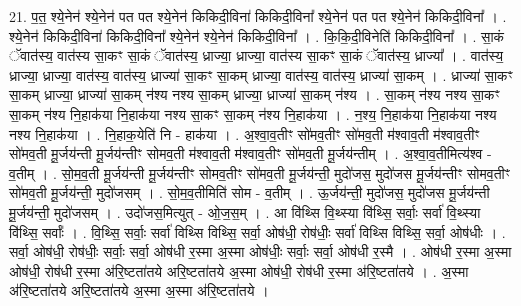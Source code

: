 \documentclass[17pt]{extarticle}
\begin{document}
21. प॒त॒ श्ये॒नेन॑ श्ये॒नेन॑ पत पत श्ये॒नेन॑ किकिदी॒विना॑ किकिदी॒विना᳚ श्ये॒नेन॑ पत पत श्ये॒नेन॑ किकिदी॒विना᳚ । . श्ये॒नेन॑ किकिदी॒विना॑ किकिदी॒विना᳚ श्ये॒नेन॑ श्ये॒नेन॑ किकिदी॒विना᳚ । . कि॒कि॒दी॒विनेति॑ किकिदी॒विना᳚ । . सा॒कं ॅवात॑स्य॒ वात॑स्य सा॒कꣳ सा॒कं ॅवात॑स्य॒ ध्राज्या॒ ध्राज्या॒ वात॑स्य सा॒कꣳ सा॒कं ॅवात॑स्य॒ ध्राज्या᳚ । . वात॑स्य॒ ध्राज्या॒ ध्राज्या॒ वात॑स्य॒ वात॑स्य॒ ध्राज्या॑ सा॒कꣳ सा॒कम् ध्राज्या॒ वात॑स्य॒ वात॑स्य॒ ध्राज्या॑ सा॒कम् । . ध्राज्या॑ सा॒कꣳ सा॒कम् ध्राज्या॒ ध्राज्या॑ सा॒कम् न॑श्य नश्य सा॒कम् ध्राज्या॒ ध्राज्या॑ सा॒कम् न॑श्य । . सा॒कम् न॑श्य नश्य सा॒कꣳ सा॒कम् न॑श्य नि॒हाक॑या नि॒हाक॑या नश्य सा॒कꣳ सा॒कम् न॑श्य नि॒हाक॑या । . न॒श्य॒ नि॒हाक॑या नि॒हाक॑या नश्य नश्य नि॒हाक॑या । . नि॒हाक॒येति॑ नि - हाक॑या । . अ॒श्वा॒व॒तीꣳ सो॑मव॒तीꣳ सो॑मव॒ती म॑श्वाव॒ती म॑श्वाव॒तीꣳ सो॑मव॒ती मू॒र्जय॑न्ती मू॒र्जय॑न्तीꣳ सोमव॒ती म॑श्वाव॒ती म॑श्वाव॒तीꣳ सो॑मव॒ती मू॒र्जय॑न्तीम् । . अ॒श्वा॒व॒तीमित्य॑श्व - व॒तीम् । . सो॒म॒व॒ती मू॒र्जय॑न्ती मू॒र्जय॑न्तीꣳ सोमव॒तीꣳ सो॑मव॒ती मू॒र्जय॑न्ती॒ मुदो॑जस॒ मुदो॑जस मू॒र्जय॑न्तीꣳ सोमव॒तीꣳ सो॑मव॒ती मू॒र्जय॑न्ती॒ मुदो॑जसम् । . सो॒म॒व॒तीमिति॑ सोम - व॒तीम् । . ऊ॒र्जय॑न्ती॒ मुदो॑जस॒ मुदो॑जस मू॒र्जय॑न्ती मू॒र्जय॑न्ती॒ मुदो॑जसम् । . उदो॑जस॒मित्युत् - ओ॒ज॒स॒म् । . आ वि॑थ्सि वि॒थ्स्या वि॑थ्सि॒ सर्वाः॒ सर्वा॑ वि॒थ्स्या वि॑थ्सि॒ सर्वाः᳚ । . वि॒थ्सि॒ सर्वाः॒ सर्वा॑ विथ्सि विथ्सि॒ सर्वा॒ ओष॑धी॒ रोष॑धीः॒ सर्वा॑ विथ्सि विथ्सि॒ सर्वा॒ ओष॑धीः । . सर्वा॒ ओष॑धी॒ रोष॑धीः॒ सर्वाः॒ सर्वा॒ ओष॑धी र॒स्मा अ॒स्मा ओष॑धीः॒ सर्वाः॒ सर्वा॒ ओष॑धी र॒स्मै । . ओष॑धी र॒स्मा अ॒स्मा ओष॑धी॒ रोष॑धी र॒स्मा अ॑रि॒ष्टता॑तये अरि॒ष्टता॑तये अ॒स्मा ओष॑धी॒ रोष॑धी र॒स्मा अ॑रि॒ष्टता॑तये । . अ॒स्मा अ॑रि॒ष्टता॑तये अरि॒ष्टता॑तये अ॒स्मा अ॒स्मा अ॑रि॒ष्टता॑तये । \newline
\end{document}
